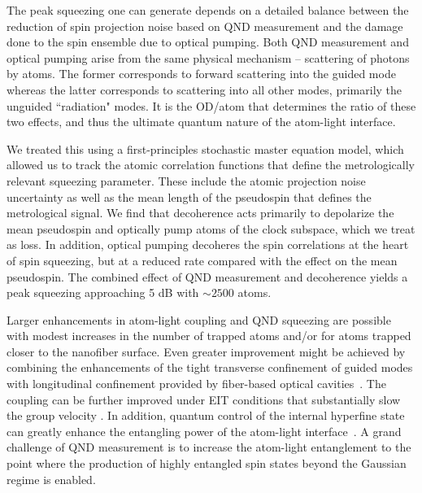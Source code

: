 \documentclass[preprint, aps,pra,onecolumn]{revtex4-1} %
\begin{document}
The peak squeezing one can generate depends on a detailed balance between the reduction of spin projection noise based on QND measurement and the damage done to the spin ensemble due to optical pumping.  
Both QND measurement and optical pumping arise from the same physical mechanism -- scattering of photons by atoms.  
The former corresponds to forward scattering into the guided mode whereas the latter corresponds to scattering into all other modes, primarily the unguided ``radiation" modes.   
It is the OD/atom that determines the ratio of these two effects, and thus the ultimate quantum nature of the atom-light interface. 

We treated this using a first-principles stochastic master equation model, which allowed us to track the atomic correlation functions that define the metrologically relevant squeezing parameter.  
These include the atomic projection noise uncertainty as well as the mean length of the pseudospin that defines the metrological signal.  
We find that decoherence acts primarily to depolarize the mean pseudospin and optically pump atoms of the clock subspace, which we treat as loss.  
In addition, optical pumping decoheres the spin correlations at the heart of spin squeezing, but at a reduced rate compared with the effect on the mean pseudospin.  
The combined effect of QND measurement and decoherence yields a peak squeezing approaching 5 dB with $\sim 2500$ atoms. 

Larger enhancements in atom-light coupling and QND squeezing are possible with modest increases in the number of trapped atoms and/or for atoms trapped closer to the nanofiber surface.  
Even greater improvement might be achieved by combining the enhancements of the tight transverse confinement of guided modes with longitudinal confinement provided by fiber-based optical cavities~\cite{le_kien_intracavity_2009, wuttke_nanofiber_2012, yalla_cavity_2014, bohnet_reduced_2014,nayak_optical_2014}.  
The coupling can be further improved under EIT conditions that substantially slow the group velocity \cite{gouraud_demonstration_2015, sayrin_storage_2015, kumar_autler-townes_2015}. 
In addition, quantum control of the internal hyperfine state \cite{smith_quantum_2013-1} can greatly enhance the entangling power of the atom-light interface~\cite{trail_strongly_2010, norris_enhanced_2012}. A grand challenge of QND measurement is to increase the atom-light entanglement to the point where the production of highly entangled spin states beyond the Gaussian regime is enabled.
\end{document}

